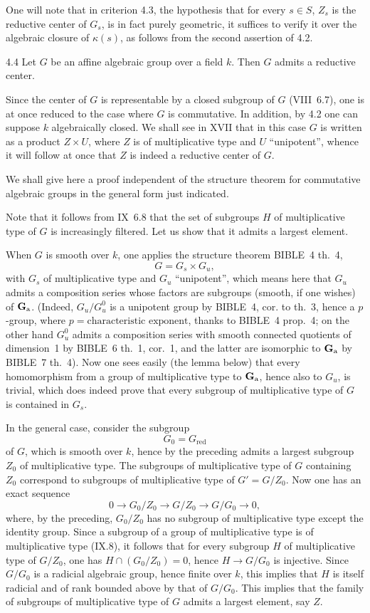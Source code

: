 One will note that in criterion 4.3, the hypothesis that for every $s\in S$, $Z_s$ is the reductive center of $G_s$, is in fact purely geometric, \ie it suffices to verify it over the algebraic closure of $\kappa(s)$, as follows from the second assertion of 4.2.
\begin{theorem}{4.4}\label{XII.4.4}
Let $G$ be an affine algebraic group over a field $k$. Then $G$ admits a reductive center.
\end{theorem}
Since the center of $G$ is representable by a closed subgroup of $G$ (VIII~6.7), one is at once reduced to the case where $G$ is commutative. In addition, by 4.2 one can suppose $k$ algebraically closed. We shall see in XVII that in this case $G$ is written as a product $Z\times U$, where $Z$ is of multiplicative type and $U$ ``unipotent'', whence it will follow at once that $Z$ is indeed a reductive center of $G$.

We shall give here a proof independent of the structure theorem for commutative algebraic groups in the general form just indicated.

Note that it follows from IX~6.8 that the set of subgroups $H$ of multiplicative type of $G$ is increasingly filtered. Let us show that it admits a largest element.

When $G$ is smooth over $k$, one applies the structure theorem BIBLE~4 th.~4,
\[
G=G_s\times G_u,
\]
with $G_s$ of multiplicative type and $G_u$ ``unipotent'', which means here that $G_u$ admits a composition series whose factors are subgroups (smooth, if one wishes) of $\mathbf{G}_{\mathrm{a}}$. (Indeed, $G_u/G_u^0$ is a unipotent group by BIBLE~4, cor. to th.~3, hence a $p$-group, where $p=\text{characteristic exponent}$, thanks to BIBLE~4 prop.~4; on the other hand $G_u^0$ admits a composition series with smooth connected quotients of dimension~1 by BIBLE~6 th.~1, cor.~1, and the latter are isomorphic to $\mathbf{G}_{\mathrm{a}}$ by BIBLE~7 th.~4). Now one sees easily (\cf the lemma below) that every homomorphism from a group of multiplicative type to $\mathbf{G}_{\mathrm{a}}$, hence also to $G_u$, is trivial, which does indeed prove that every subgroup of multiplicative type of $G$ is contained in $G_s$.

In the general case, consider the subgroup
\[
G_0=G_{\mathrm{red}}
\]
of $G$, which is smooth over $k$, hence by the preceding admits a largest subgroup $Z_0$ of multiplicative type. The subgroups of multiplicative type of $G$ containing $Z_0$ correspond to subgroups of multiplicative type of $G'=G/Z_0$. Now one has an exact sequence
\[
0\to G_0/Z_0\to G/Z_0\to G/G_0\to0,
\]
where, by the preceding, $G_0/Z_0$ has no subgroup of multiplicative type except the identity group. Since a subgroup of a group of multiplicative type is of multiplicative type (IX.8), it follows that for every subgroup $H$ of multiplicative type of $G/Z_0$, one has $H\cap(G_0/Z_0)=0$, hence $H\to G/G_0$ is injective. Since $G/G_0$ is a radicial algebraic group, hence finite over $k$, this implies that $H$ is itself radicial and of rank bounded above by that of $G/G_0$. This implies that the family of subgroups of multiplicative type of $G$ admits a largest element, say $Z$.

